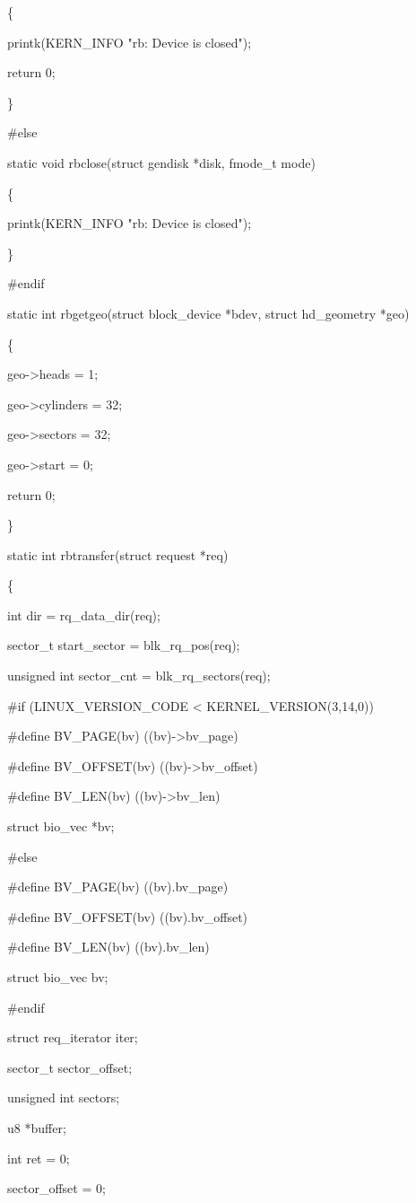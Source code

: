 \documentclass[11pt]{article}
\begin{document}
\{

	printk(KERN\_INFO "rb: Device is closed\n");
	
	return 0;
	
\}

\#else

static void rbclose(struct gendisk *disk, fmode\_t mode)

\{

	printk(KERN\_INFO "rb: Device is closed\n");
	
\}

\#endif

static int rbgetgeo(struct block\_device *bdev, struct hd\_geometry *geo)

\{

	geo->heads = 1;
	
	geo->cylinders = 32;
	
	geo->sectors = 32;
	
	geo->start = 0;
	
	return 0;
	
\}


static int rbtransfer(struct request *req)

\{

	int dir = rq\_data\_dir(req);
	
	sector\_t start\_sector = blk\_rq\_pos(req);
	
	unsigned int sector\_cnt = blk\_rq\_sectors(req);

\#if (LINUX\_VERSION\_CODE < KERNEL\_VERSION(3,14,0))

\#define BV\_PAGE(bv) ((bv)->bv\_page)

\#define BV\_OFFSET(bv) ((bv)->bv\_offset)

\#define BV\_LEN(bv) ((bv)->bv\_len)

	struct bio\_vec *bv;
	
\#else

\#define BV\_PAGE(bv) ((bv).bv\_page)

\#define BV\_OFFSET(bv) ((bv).bv\_offset)

\#define BV\_LEN(bv) ((bv).bv\_len)

	struct bio\_vec bv;
	
\#endif

	struct req\_iterator iter;

	sector\_t sector\_offset;
	
	unsigned int sectors;
	
	u8 *buffer;

	int ret = 0;


	sector\_offset = 0;
	
\end{document}
